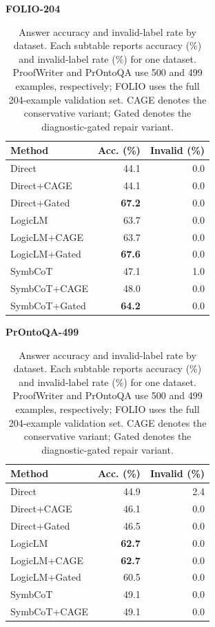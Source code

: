 \documentclass{article}
\begin{document}
\begin{table}[t]
\caption{Answer accuracy and invalid-label rate by dataset. Each subtable reports accuracy (\%) and invalid-label rate (\%) for one dataset. ProofWriter and PrOntoQA use 500 and 499 examples, respectively; FOLIO uses the full 204-example validation set. CAGE denotes the conservative variant; Gated denotes the diagnostic-gated repair variant.}
\label{tab:main-results}
\centering
\vspace{0.5em}
\scriptsize
\setlength{\tabcolsep}{2.5pt}

\begin{minipage}[t]{0.30\linewidth}
\centering
\textbf{FOLIO-204}\\[0.2em]
\begin{tabular}{lrr}
\toprule
Method & Acc. (\%) & Invalid (\%) \\
\midrule
Direct & 44.1 & 0.0 \\
Direct+CAGE & 44.1 & 0.0 \\
Direct+Gated & \textbf{67.2} & 0.0 \\
\midrule
LogicLM & 63.7 & 0.0 \\
LogicLM+CAGE & 63.7 & 0.0 \\
LogicLM+Gated & \textbf{67.6} & 0.0 \\
\midrule
SymbCoT & 47.1 & 1.0 \\
SymbCoT+CAGE & 48.0 & 0.0 \\
SymbCoT+Gated & \textbf{64.2} & 0.0 \\
\bottomrule
\end{tabular}
\end{minipage}
\hspace{0.015\linewidth}
\begin{minipage}[t]{0.30\linewidth}
\centering
\textbf{PrOntoQA-499}\\[0.2em]
\begin{tabular}{lrr}
\toprule
Method & Acc. (\%) & Invalid (\%) \\
\midrule
Direct & 44.9 & 2.4 \\
Direct+CAGE & 46.1 & 0.0 \\
Direct+Gated & 46.5 & 0.0 \\
\midrule
LogicLM & \textbf{62.7} & 0.0 \\
LogicLM+CAGE & \textbf{62.7} & 0.0 \\
LogicLM+Gated & 60.5 & 0.0 \\
\midrule
SymbCoT & 49.1 & 0.0 \\
SymbCoT+CAGE & 49.1 & 0.0 \\

\end{tabular}
\end{minipage}
\end{table}
\end{document}
